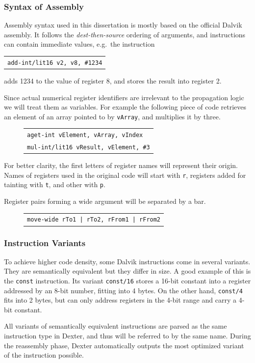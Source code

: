 \documentclass[12pt,twoside,notitlepage]{report}
\newcommand{\centerbox}[1] {
	\begin{center}
	\begin{footnotesize}
	\begin{tabular}{l}
		#1
	\end{tabular}
	\end{footnotesize}
	\end{center}
}
\newcommand{\asm}[1] {\texttt{#1}}
\begin{document}
\subsubsection{Syntax of Assembly}

Assembly syntax used in this dissertation is mostly based on the official Dalvik assembly\cite{web:DalvikBytecode}. It follows the \emph{dest-then-source} ordering of arguments, and instructions can contain immediate values, e.g.\ the instruction
		\centerbox{
			\asm{add-int/lit16 v2, v8, \#1234}
		}
adds 1234 to the value of register 8, and stores the result into register 2. 

Since actual numerical register identifiers are irrelevant to the propagation logic we will treat them as variables. For example the following piece of code retrieves an element of an array pointed to by \verb$vArray$, and multiplies it by three.
	\begin{figure}[H]
		\centerbox{
			\asm{aget-int vElement, vArray, vIndex} \\
			\asm{mul-int/lit16 vResult, vElement, \#3}
		}
	\end{figure}

For better clarity, the first letters of register names will represent their origin. Names of registers used in the original code will start with \verb$r$, registers added for tainting with \verb$t$, and other with \verb$p$.

Register pairs forming a wide argument will be separated by a bar.
	\begin{figure}[H]
		\centerbox{
			\asm{move-wide rTo1 | rTo2, rFrom1 | rFrom2}
		}
	\end{figure}

\subsubsection{Instruction Variants}

To achieve higher code density, some Dalvik instructions come in several variants\cite{web:DalvikBytecode}. They are semantically equivalent but they differ in size. A good example of this is the \verb$const$ instruction. Its variant \verb$const/16$ stores a 16-bit constant into a register addressed by an 8-bit number, fitting into 4 bytes. On the other hand, \verb$const/4$ fits into 2 bytes, but can only address registers in the 4-bit range and carry a 4-bit constant.

All variants of semantically equivalent instructions are parsed as the same instruction type in Dexter, and thus will be referred to by the same name. During the reassembly phase, Dexter automatically outputs the most optimized variant of the instruction possible.
\end{document}
